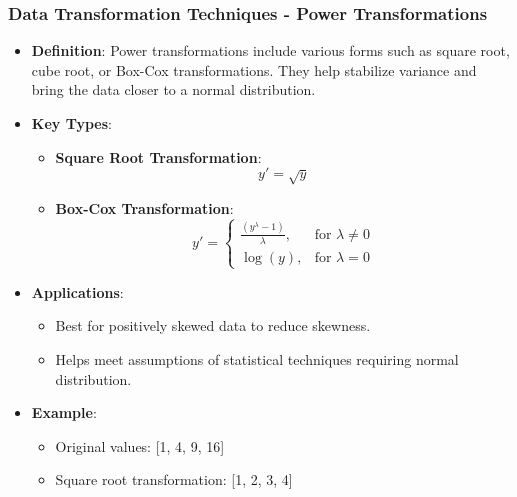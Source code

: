 \documentclass[aspectratio=169]{beamer}
\begin{document}
\begin{frame}[fragile]
    \frametitle{Data Transformation Techniques - Power Transformations}
    \begin{itemize}
        \item \textbf{Definition}: Power transformations include various forms such as square root, cube root, or Box-Cox transformations. They help stabilize variance and bring the data closer to a normal distribution.
        
        \item \textbf{Key Types}:
        \begin{itemize}
            \item \textbf{Square Root Transformation}:
            \begin{equation}
                y' = \sqrt{y}
            \end{equation}
            \item \textbf{Box-Cox Transformation}:
            \begin{equation}
                y' = 
                \begin{cases}
                    \frac{(y^{\lambda} - 1)}{\lambda}, & \text{for } \lambda \neq 0 \\
                    \log(y), & \text{for } \lambda = 0
                \end{cases}
            \end{equation}
        \end{itemize}
        
        \item \textbf{Applications}:
        \begin{itemize}
            \item Best for positively skewed data to reduce skewness.
            \item Helps meet assumptions of statistical techniques requiring normal distribution.
        \end{itemize}
        
        \item \textbf{Example}:
        \begin{itemize}
            \item Original values: [1, 4, 9, 16]
            \item Square root transformation: [1, 2, 3, 4]
        \end{itemize}
    \end{itemize}
\end{frame}
\end{document}
